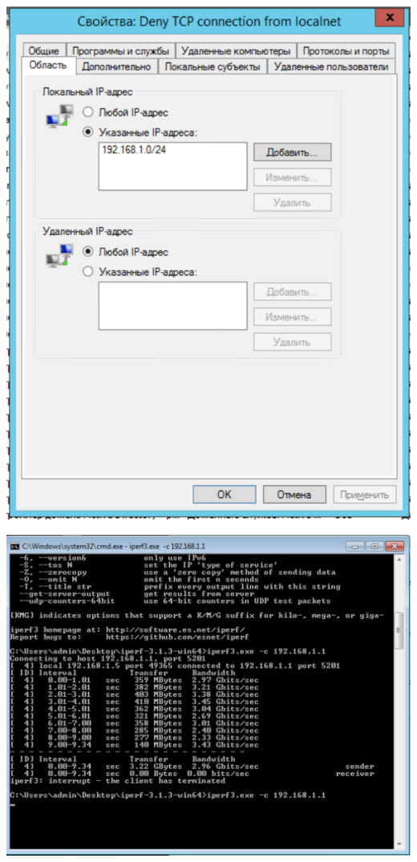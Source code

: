 \documentclass[a4paper,14pt]{extarticle}
\begin{document}
    \begin{center}
        \includegraphics[scale=0.7]{7.2.2.png}
    \end{center}

    \begin{center}
        \includegraphics[scale=0.8]{7.2.3.png}
    \end{center}
\end{document}
